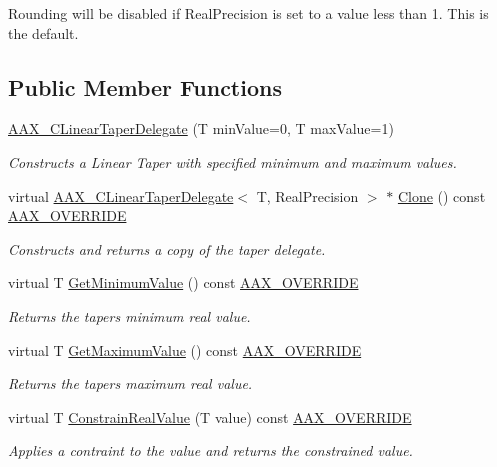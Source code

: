 Rounding will be disabled if Real\+Precision is set to a value less than 1. This is the default. \subsection*{Public Member Functions}
\begin{DoxyCompactItemize}
\item 
\hyperlink{a00022_a790c48a2dd573b3304cf4cc117d97a95}{A\+A\+X\+\_\+\+C\+Linear\+Taper\+Delegate} (T min\+Value=0, T max\+Value=1)
\begin{DoxyCompactList}\small\item\em Constructs a Linear Taper with specified minimum and maximum values. \end{DoxyCompactList}\item 
virtual \hyperlink{a00022}{A\+A\+X\+\_\+\+C\+Linear\+Taper\+Delegate}$<$ T, Real\+Precision $>$ $\ast$ \hyperlink{a00022_a022c70f963f1fb15238d21199d2d0ed9}{Clone} () const \hyperlink{a00149_ac2f24a5172689ae684344abdcce55463}{A\+A\+X\+\_\+\+O\+V\+E\+R\+R\+I\+D\+E}
\begin{DoxyCompactList}\small\item\em Constructs and returns a copy of the taper delegate. \end{DoxyCompactList}\item 
virtual T \hyperlink{a00022_a2cf320765c16f7cd45e603e33887f469}{Get\+Minimum\+Value} () const \hyperlink{a00149_ac2f24a5172689ae684344abdcce55463}{A\+A\+X\+\_\+\+O\+V\+E\+R\+R\+I\+D\+E}
\begin{DoxyCompactList}\small\item\em Returns the taper\textquotesingle{}s minimum real value. \end{DoxyCompactList}\item 
virtual T \hyperlink{a00022_a518a8360a9b965d4f35749ecb8714749}{Get\+Maximum\+Value} () const \hyperlink{a00149_ac2f24a5172689ae684344abdcce55463}{A\+A\+X\+\_\+\+O\+V\+E\+R\+R\+I\+D\+E}
\begin{DoxyCompactList}\small\item\em Returns the taper\textquotesingle{}s maximum real value. \end{DoxyCompactList}\item 
virtual T \hyperlink{a00022_aad9ea52c4f3c4cae45b6d5309c2833de}{Constrain\+Real\+Value} (T value) const \hyperlink{a00149_ac2f24a5172689ae684344abdcce55463}{A\+A\+X\+\_\+\+O\+V\+E\+R\+R\+I\+D\+E}
\begin{DoxyCompactList}\small\item\em Applies a contraint to the value and returns the constrained value. \end{DoxyCompactList}\item 

\end{DoxyCompactItemize}

